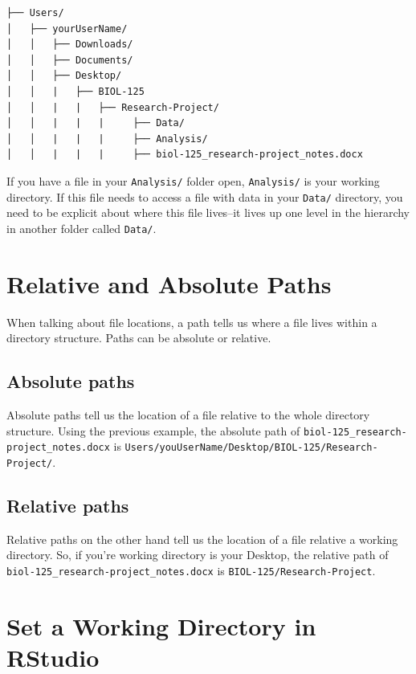 \documentclass[
]{book}
\begin{document}
\begin{verbatim}
├── Users/
│   ├── yourUserName/
│   │   ├── Downloads/
│   │   ├── Documents/
│   │   ├── Desktop/
│   │   |   ├── BIOL-125
│   │   |   |   ├── Research-Project/
│   │   |   |   |     ├── Data/
│   │   |   |   |     ├── Analysis/
│   │   |   |   |     ├── biol-125_research-project_notes.docx
\end{verbatim}

If you have a file in your \texttt{Analysis/} folder open, \texttt{Analysis/} is your working directory. If this file needs to access a file with data in your \texttt{Data/} directory, you need to be explicit about where this file lives--it lives up one level in the hierarchy in another folder called \texttt{Data/}.

\hypertarget{relative-and-absolute-paths}{%
\section{Relative and Absolute Paths}\label{relative-and-absolute-paths}}

When talking about file locations, a path tells us where a file lives within a directory structure. Paths can be absolute or relative.

\hypertarget{absolute-paths}{%
\subsection*{Absolute paths}\label{absolute-paths}}

Absolute paths tell us the location of a file relative to the whole directory structure. Using the previous example, the absolute path of \texttt{biol-125\_research-project\_notes.docx} is \texttt{Users/youUserName/Desktop/BIOL-125/Research-Project/}.

\hypertarget{relative-paths}{%
\subsection*{Relative paths}\label{relative-paths}}

Relative paths on the other hand tell us the location of a file relative a working directory. So, if you're working directory is your Desktop, the relative path of \texttt{biol-125\_research-project\_notes.docx} is \texttt{BIOL-125/Research-Project}.

\hypertarget{set-a-working-directory-in-rstudio}{%
\section{Set a Working Directory in RStudio}\label{set-a-working-directory-in-rstudio}}
\end{document}
